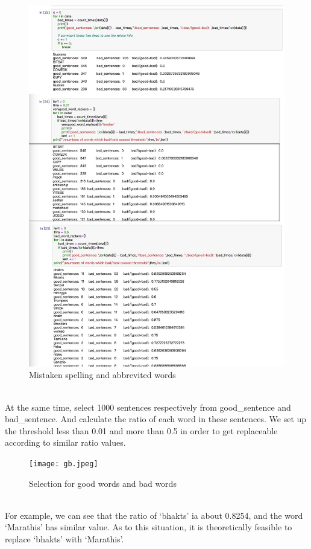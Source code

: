 \documentclass{article}
\begin{document}
\begin{figure}[h]
	\centering
	\includegraphics[scale = 0.15]{insert.jpeg}
	\caption{Mistaken spelling and abbrevited words}
\end{figure}\\
\noindent At the same time, select 1000 sentences respectively from good\_sentence and bad\_sentence. And calculate the ratio of each word in these sentences. We set up the threshold less than 0.01 and more than 0.5 in order to get replaceable according to similar ratio values.  
\begin{figure}[h]
	\centering
	\texttt{[image: gb.jpeg]}
	\caption{Selection for good words and bad words}
\end{figure}\\

\noindent For example, we can see that the ratio of ‘bhakts’ ia about 0.8254, and the word ‘Marathis’ has similar value. As to this situation, it is theoretically feasible to replace ‘bhakts’ with ‘Marathis’. \\
\end{document}
